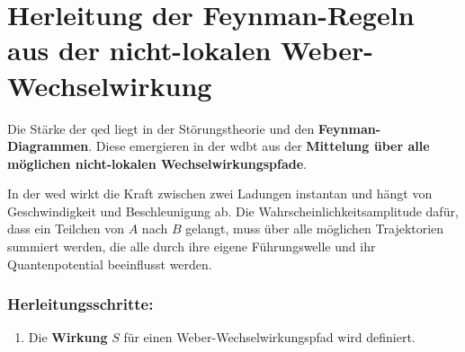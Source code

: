 \section{Herleitung der Feynman-Regeln aus der nicht-lokalen Weber-Wechselwirkung}
Die Stärke der \gls{qed} liegt in der Störungstheorie und den \textbf{Feynman-Diagrammen}. Diese emergieren in der \gls{wdbt} aus der \textbf{Mittelung über alle möglichen nicht-lokalen Wechselwirkungspfade}.

In der \gls{wed} wirkt die Kraft zwischen zwei Ladungen instantan und hängt von Geschwindigkeit und Beschleunigung ab. Die Wahrscheinlichkeitsamplitude dafür, dass ein Teilchen von $A$ nach $B$ gelangt,
muss über alle möglichen Trajektorien summiert werden, die alle durch ihre eigene Führungswelle und ihr Quantenpotential beeinflusst werden.

\subsubsection{Herleitungsschritte:}
\begin{enumerate}
    \item Die \textbf{Wirkung} $S$ für einen Weber-Wechselwirkungspfad wird definiert.
\end{enumerate}

